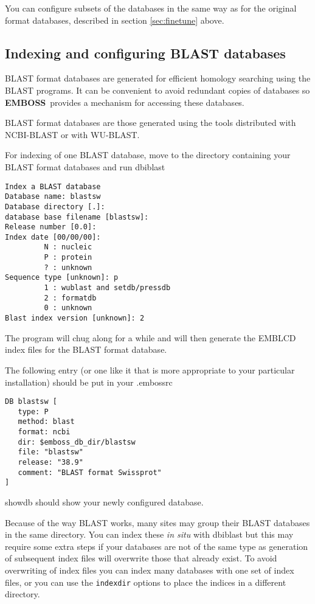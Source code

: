 \documentclass{report}
\newcommand{\ilcomm}[1]{{\tt #1}}
\newcommand{\filename}[1]{{\sf\textsl #1}}
\newcommand{\progname}[1]{{\sc #1}}
\newcommand{\EMBOSS}{{\sf\bfseries EMBOSS}}
\begin{document}
You can configure subsets of the databases in the same way as for the original format databases, described in section \ref{sec:finetune} above.

\subsection{Indexing and configuring BLAST databases}
BLAST format databases are generated for efficient homology searching using the BLAST programs. It can be convenient to avoid redundant copies of databases so \EMBOSS\ provides a mechanism for accessing these databases.

BLAST format databases are those generated using the tools distributed with NCBI-BLAST or with WU-BLAST. \begin{comment}At present \EMBOSS\ will only index BLAST databases created from FASTA format input files with one of the recognised header formats.
More information on the relevant formats can be found in subsection \ref{subsec:fasta} below.\end{comment}
For indexing of one BLAST database, move to the directory containing your BLAST format databases and run \progname{dbiblast}
\begin{verbatim}
Index a BLAST database
Database name: blastsw
Database directory [.]: 
database base filename [blastsw]: 
Release number [0.0]: 
Index date [00/00/00]: 
         N : nucleic
         P : protein
         ? : unknown
Sequence type [unknown]: p
         1 : wublast and setdb/pressdb
         2 : formatdb
         0 : unknown
Blast index version [unknown]: 2

\end{verbatim}
The program will chug along for a while and will then generate the EMBLCD index files for the BLAST format database.

The following entry (or one like it that is more appropriate to your particular installation) should be put in your \filename{.embossrc}
\begin{verbatim}
DB blastsw [
   type: P
   method: blast
   format: ncbi
   dir: $emboss_db_dir/blastsw
   file: "blastsw"
   release: "38.9"
   comment: "BLAST format Swissprot"
]
\end{verbatim}
\progname{showdb} should show your newly configured database.

Because of the way BLAST works, many sites may group their BLAST databases in the same directory. You can index these {\it in situ} with \progname{dbiblast} but this may require some extra steps if your databases are not of the same type as generation of subsequent index files will overwrite those that already exist. To avoid overwriting of index files you can index many databases with one set of index files, or you can use the \ilcomm{indexdir} options to place the indices in a different directory.
\end{document}
